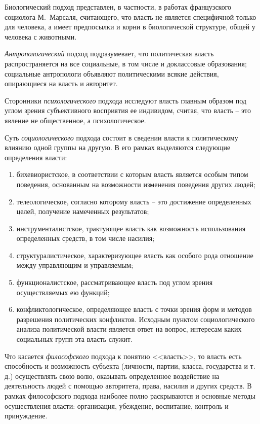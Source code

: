 Биологический подход представлен, в частности, в работах французского социолога
М.~Марсаля, считающего, что власть не является специфичной только для человека,
а имеет предпосылки и корни в биологической структуре, общей у человека с
животными.

\emph{Антропологический} подход подразумевает, что политическая власть
распространяется на все социальные, в том числе и доклассовые образования;
социальные антропологи объявляют политическими всякие действия, опирающиеся на
власть и авторитет.

Сторонники \emph{психологического} подхода исследуют власть главным образом под
углом зрения субъективного восприятия ее индивидом, считая, что власть -- это
явление не общественное, а психологическое.

Суть \emph{социологического} подхода состоит в сведении власти к политическому
влиянию одной группы на другую. В его рамках выделяются следующие определения
власти:
\begin{enumerate}
    \item бихевиористское, в соответствии с которым власть является особым
    типом поведения, основанным на возможности изменения поведения других
    людей;
    \item телеологическое, согласно которому власть -- это достижение
    определенных целей, получение намеченных результатов;
    \item инструменталистское, трактующее власть как возможность использования
    определенных средств, в том числе насилия;
    \item структуралистическое, характеризующее власть как особого рода
    отношение между управляющим и управляемым;
    \item функционалистское, рассматривающее власть под углом зрения
    осуществляемых ею функций;
    \item конфликтологическое, определяющее власть с точки зрения форм и
    методов разрешения политических конфликтов. Исходным пунктом
    социологического анализа политической власти является ответ на вопрос,
    интересам каких социальных групп эта власть служит.
\end{enumerate}

Что касается \emph{философского} подхода к понятию <<власть>>, то власть есть
способность и возможность субъекта (личности, партии, класса, государства и
т. д.) осуществлять свою волю, оказывать определенное воздействие на
деятельность людей с помощью авторитета, права, насилия и других средств. В
рамках философского подхода наиболее полно раскрываются и основные методы
осуществления власти: организация, убеждение, воспитание, контроль и
принуждение.

